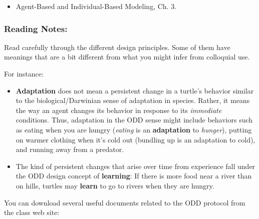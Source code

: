 \documentclass[
]{article}
\providecommand{\tightlist}{%
  \setlength{\itemsep}{0pt}\setlength{\parskip}{0pt}}
\begin{document}
\begin{itemize}
\tightlist
\item
  Agent-Based and Individual-Based Modeling, Ch. 3.
\end{itemize}

\hypertarget{reading-notes-2}{%
\subsubsection{Reading Notes:}\label{reading-notes-2}}

Read carefully through the different design principles. Some of them
have meanings that are a bit different from what you might infer from
colloquial use.

For instance:

\begin{itemize}
\tightlist
\item
  \textbf{Adaptation} does not mean a persistent change in a turtle's
  behavior similar to the biological/Darwinian sense of adaptation in
  species. Rather, it means the way an agent changes its behavior in
  response to its \emph{immediate} conditions. Thus, adaptation in the
  ODD sense might include behaviors such as eating when you are hungry
  (\emph{eating} is an \textbf{adaptation} to \emph{hunger}), putting on
  warmer clothing when it's cold out (bundling up is an adaptation to
  cold), and running away from a predator.
\item
  The kind of persistent changes that arise over time from experience
  fall under the ODD design concept of \textbf{learning}: If there is
  more food near a river than on hills, turtles may \textbf{learn} to go
  to rivers when they are hungry.
\end{itemize}

You can download several useful documents related to the ODD protocol
from the class web site:
\end{document}
